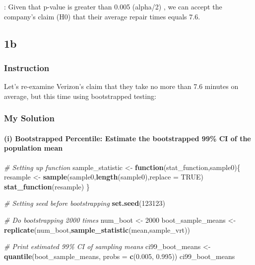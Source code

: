 \documentclass[
]{article}
\newenvironment{Shaded}{\begin{snugshade}}{\end{snugshade}}
\newcommand{\AttributeTok}[1]{\textcolor[rgb]{0.13,0.29,0.53}{#1}}
\newcommand{\CommentTok}[1]{\textcolor[rgb]{0.56,0.35,0.01}{\textit{#1}}}
\newcommand{\ConstantTok}[1]{\textcolor[rgb]{0.56,0.35,0.01}{#1}}
\newcommand{\ControlFlowTok}[1]{\textcolor[rgb]{0.13,0.29,0.53}{\textbf{#1}}}
\newcommand{\DecValTok}[1]{\textcolor[rgb]{0.00,0.00,0.81}{#1}}
\newcommand{\FloatTok}[1]{\textcolor[rgb]{0.00,0.00,0.81}{#1}}
\newcommand{\FunctionTok}[1]{\textcolor[rgb]{0.13,0.29,0.53}{\textbf{#1}}}
\newcommand{\NormalTok}[1]{#1}
\newcommand{\OtherTok}[1]{\textcolor[rgb]{0.56,0.35,0.01}{#1}}
\begin{document}
: Given that p-value is greater than 0.005 (alpha/2) , we can accept the
company's claim (H0) that their average repair times equals 7.6.

\hypertarget{b}{%
\subsection{1b}\label{b}}

\hypertarget{instruction-1}{%
\subsubsection{Instruction}\label{instruction-1}}

Let's re-examine Verizon's claim that they take no more than 7.6 minutes
on average, but this time using bootstrapped testing:

\hypertarget{my-solution-1}{%
\subsubsection{My Solution}\label{my-solution-1}}

\hypertarget{i-bootstrapped-percentile-estimate-the-bootstrapped-99-ci-of-the-population-mean}{%
\paragraph{(i) Bootstrapped Percentile: Estimate the bootstrapped 99\%
CI of the population
mean}\label{i-bootstrapped-percentile-estimate-the-bootstrapped-99-ci-of-the-population-mean}}

\begin{Shaded}
\begin{Highlighting}[]
\CommentTok{\# Setting up function}
\NormalTok{sample\_statistic }\OtherTok{\textless{}{-}} \ControlFlowTok{function}\NormalTok{(stat\_function,sample0)\{}
\NormalTok{  resample }\OtherTok{\textless{}{-}} \FunctionTok{sample}\NormalTok{(sample0,}\FunctionTok{length}\NormalTok{(sample0),}\AttributeTok{replace =} \ConstantTok{TRUE}\NormalTok{)}
  \FunctionTok{stat\_function}\NormalTok{(resample)}
\NormalTok{\}}

\CommentTok{\# Setting seed before bootstrapping}
\FunctionTok{set.seed}\NormalTok{(}\DecValTok{123123}\NormalTok{)}

\CommentTok{\# Do bootstrapping 2000 times}
\NormalTok{num\_boot }\OtherTok{\textless{}{-}} \DecValTok{2000}
\NormalTok{boot\_sample\_means }\OtherTok{\textless{}{-}} \FunctionTok{replicate}\NormalTok{(num\_boot,}\FunctionTok{sample\_statistic}\NormalTok{(mean,sample\_vrt))}

\CommentTok{\# Print estimated 99\% CI of sampling means}
\NormalTok{ci99\_boot\_means }\OtherTok{\textless{}{-}} \FunctionTok{quantile}\NormalTok{(boot\_sample\_means, }\AttributeTok{probs =} \FunctionTok{c}\NormalTok{(}\FloatTok{0.005}\NormalTok{, }\FloatTok{0.995}\NormalTok{))}
\NormalTok{ci99\_boot\_means}
\end{Highlighting}
\end{Shaded}
\end{document}
